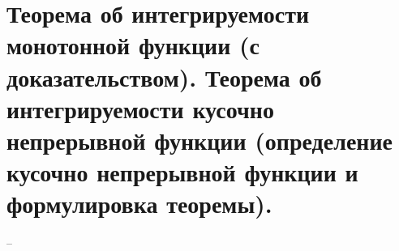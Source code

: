 \section{Теорема об интегрируемости монотонной функции (с доказательством). Теорема об интегрируемости кусочно непрерывной функции (определение кусочно непрерывной функции и формулировка теоремы).}
--
\newline